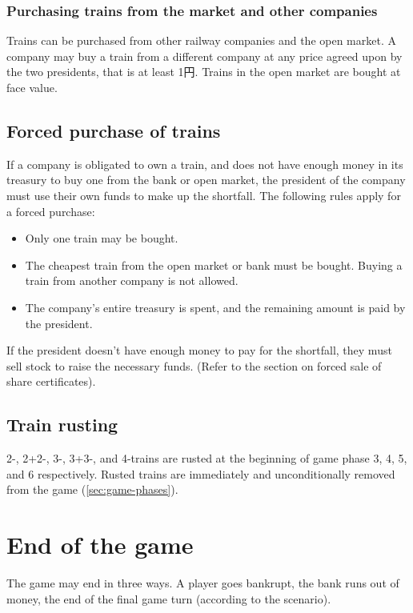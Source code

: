 \documentclass{article}
\begin{document}
\begin{CJK}{UTF8}{min}
\begin{multicols}{2}
\subsubsection{Purchasing trains from the market and other companies}
\label{trains-buying-from-companies}

Trains can be purchased from other railway companies and the open
market.  A company may buy a train from a different company at any
price agreed upon by the two presidents, that is at least 1円. Trains
in the open market are bought at face value.

\subsection{Forced purchase of trains} \label{train-force-buy}
If a company is obligated to own a train, and does not have enough
money in its treasury to buy one from the bank or open market, the
president of the company must use their own funds to make up the
shortfall. The following rules apply for a forced purchase:

\begin{itemize}
\item Only one train may be bought.
\item The cheapest train from the open market or bank must be
  bought. Buying a train from another company is not allowed.
\item The company's entire treasury is spent, and the remaining amount
  is paid by the president.
\end{itemize}

If the president doesn't have enough money to pay for the shortfall,
they must sell stock to raise the necessary funds. (Refer to the
section on forced sale of share certificates).

\subsection{Train rusting}

2-, 2+2-, 3-, 3+3-, and 4-trains are rusted at the
beginning of game phase 3, 4, 5, and 6 respectively. Rusted trains are
immediately and unconditionally removed from the game
(\autoref{sec:game-phases}).


\section{End of the game}
The game may end in three ways. A player goes bankrupt, the bank runs
out of money, the end of the final game turn (according to the
scenario).


\end{multicols}
\end{CJK}
\end{document}
